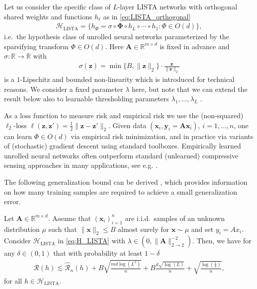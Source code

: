 \documentclass{svproc}
\newcommand{\corr}[1]{#1}
\newcommand{\bA}{\boldsymbol{A}}
\newcommand{\bx}{\boldsymbol{x}}
\newcommand{\by}{\boldsymbol{y}}
\newcommand{\bz}{\boldsymbol{z}}
\newcommand{\bPhi}{\boldsymbol{\Phi}}
\newcommand{\0}{\boldsymbol{0}}
\newcommand{\1}{\boldsymbol{1}}
\newcommand{\calH}{\mathcal{H}}
\newcommand{\calR}{\mathcal{R}}
\renewcommand{\hat}{\widehat}
\def\calH{\mathcal{H}}
\def\R{\mathbb{R}}
\def\calR{\mathcal{R}}
\begin{document}
Let us consider the specific class of $L$-layer LISTA networks with orthogonal shared weights and functions $h_\ell$ as in \eqref{eq:LISTA_orthogonal} 
\begin{align}
\label{eq:H_LISTA}
    \calH_{\text{LISTA}} = \{ h_\Phi = \sigma \circ \bPhi \circ h_L \circ \cdots \circ h_1 : \Phi \in O(d)\},
\end{align}
i.e.\ the hypothesis \corr{class} of unrolled neural networks parameterized by the sparsifying transform $\Phi \in O(d)$. Here $\bA \in \R^{m\times d}$ is fixed in advance and $\sigma \colon \R \to \R$ with
\begin{align*}
    \sigma(\bz) = \min\{ B, \| \bz \|_2 \} \cdot \frac{\bz}{\| \bz \|_2}
\end{align*}
is a $1$-Lipschitz and bounded non-linearity which is introduced for technical reasons. We consider a fixed parameter $\lambda$ here, but note that we can extend the result below also to learnable thresholding parameters $\lambda_1,\hdots,\lambda_L$ \cite{schnoor2023generalization}.

As a loss function to measure risk and empirical risk we use
the (non-squared) $\ell_2$-loss $\ell(\bz,\bz') = \frac{1}{2} \| \bz - \bz' \|_2$. Given data \corr{$(\bx_i,\by_i=\bA\bx_i)$}, $i=1,\hdots, n$,
one can learn $\Phi \in \corr{O(d)}$ via empirical risk minimization, and in practice via variants of (stochastic) gradient descent using standard toolboxes. Empirically learned unrolled neural \corr{networks} often outperform standard (unlearned) compressive sensing approaches in many applications, see e.g. \cite{behboodi2022compressive,schnoor2023generalization,kouni23}.

The following generalization bound can be derived \cite{behboodi2022compressive}, which provides information on how many training samples are required to achieve \corr{a} small generalization error.

\begin{theorem}
\label{thm:GeneralizationLISTA_simple}
    Let $\bA \in \R^{m\times d}$. Assume that $(\bx_i)_{i=1}^n$ are i.i.d.\ samples of an unknown distribution $\mu$ such that $\|\bx\|_2 \leq B$ almost surely for $\bx \sim \mu$ and set
    $y_i = A x_i$. %
    Consider $\calH_{\text{LISTA}}$ in \eqref{eq:H_LISTA} with $\lambda \in (0,\|\bA \|_{2\to 2}^{-2})$. Then, we have for any $\delta \in (0,1)$ that with probability at least $1-\delta$
    \begin{align*}
        \calR(h) \lesssim \hat{\calR}_n(h) + B \sqrt{\frac{md \log(L^2)}{n}} + B \frac{d \sqrt{\log(L)}}{n} + \sqrt{\frac{\log(\frac{1}{\delta})}{n}},
    \end{align*}
    for all $h \in \calH_{\text{LISTA}}$.
\end{theorem}
\end{document}
